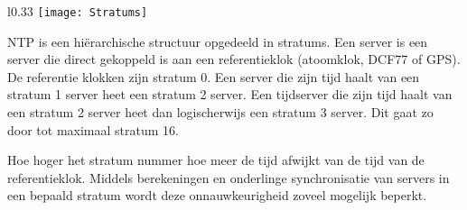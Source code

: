 
\begin{wrapfigure}{l}{0.33\textwidth} %
    \centering
    \texttt{[image: Stratums]}
\end{wrapfigure}

NTP is een hi\"erarchische structuur opgedeeld in stratums. Een  server is een server die direct gekoppeld is aan een referentieklok (atoomklok, DCF77 of GPS). De referentie klokken zijn stratum 0. Een server die zijn tijd haalt van een stratum 1 server heet een stratum 2 server. Een tijdserver die zijn tijd haalt van een stratum 2 server heet dan logischerwijs een stratum 3 server. Dit gaat zo door tot maximaal stratum 16.

Hoe hoger het stratum nummer hoe meer de tijd afwijkt van de tijd van de referentieklok. Middels berekeningen en onderlinge synchronisatie van servers in een bepaald stratum wordt deze onnauwkeurigheid zoveel mogelijk beperkt.

